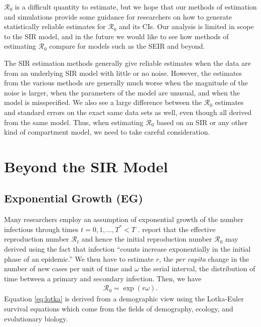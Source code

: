 \documentclass[12pt]{article}
\newcommand{\rr}{\ensuremath{\mathcal{R}_0}}
\begin{document}
$\rr$ is a difficult quantity to estimate, but we hope that our methods of estimation and simulations provide some guidance for researchers on how to generate statistically reliable estimates for $\rr$ and its CIs.  Our analysis is limited in scope to the SIR model, and in the future we would like to see how methods of estimating $\rr$ compare for models such as the SEIR and beyond.






The SIR estimation methods generally give reliable estimates when the data are from an underlying SIR model with little or no noise. However, the estimates from the various methods are generally much worse when the magnitude of the noise is larger, when the parameters of the model are unusual, and when the model is misspecified. We also see a large difference between the $\rr$ estimates and standard errors on the exact same data sets as well, even though all derived from the same model. Thus, when estimating $\rr$ based on an SIR or any other kind of compartment model, we need to take careful consideration.





\appendix

\section{Beyond the SIR Model}


\subsection{Exponential Growth (EG)}\label{sec:expgrowth}
Many researchers employ an assumption of exponential growth of the number infectious through times $t=0, 1, \dots, T^* <T$ \citep{wallinga2007generation,fisman2014,nishiura2016,majumder2016,towers2016}.
\cite{wallinga2007generation} report that the effective reproduction number $\mathcal{R}_t$ and hence the initial reproduction number $\rr$ may derived using the fact that infection ``counts increase exponentially in the initial phase of an epidemic.''  We then have to estimate $r$, the \textit{per capita} change in the number of new cases per unit of time and $\omega$ the serial interval, the distribution of time between a primary and secondary infection. Then, we have
\begin{align}\label{eq:lotka}
\rr = \exp{(r \omega)}.
\end{align}
Equation \eqref{eq:lotka} is derived from a demographic view using the Lotka-Euler survival equations which come from the fields of demography, ecology, and evolutionary biology.
\end{document}
